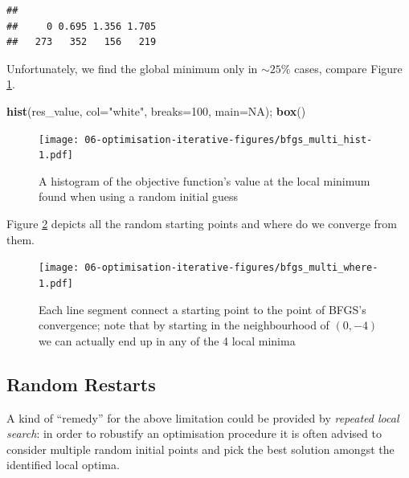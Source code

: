 \documentclass[10pt,b5paper,krantz1]{krantz}
\newenvironment{Shaded}{\begin{snugshade}}{\end{snugshade}}
\newcommand{\DataTypeTok}[1]{\textcolor[rgb]{0.27,0.27,0.27}{#1}}
\newcommand{\DecValTok}[1]{\textcolor[rgb]{0.06,0.06,0.06}{#1}}
\newcommand{\KeywordTok}[1]{\textcolor[rgb]{0.27,0.27,0.27}{\textbf{#1}}}
\newcommand{\NormalTok}[1]{#1}
\newcommand{\OtherTok}[1]{\textcolor[rgb]{0.37,0.37,0.37}{#1}}
\newcommand{\StringTok}[1]{\textcolor[rgb]{0.5,0.5,0.5}{#1}}
\begin{document}
\begin{verbatim}
## 
##     0 0.695 1.356 1.705 
##   273   352   156   219
\end{verbatim}

Unfortunately, we find the global minimum only in \(\sim 25\%\) cases,
compare Figure \ref{fig:bfgs_multi_hist}.

\begin{Shaded}
\begin{Highlighting}[]
\KeywordTok{hist}\NormalTok{(res_value, }\DataTypeTok{col=}\StringTok{"white"}\NormalTok{, }\DataTypeTok{breaks=}\DecValTok{100}\NormalTok{, }\DataTypeTok{main=}\OtherTok{NA}\NormalTok{); }\KeywordTok{box}\NormalTok{()}
\end{Highlighting}
\end{Shaded}

\begin{figure}
\hypertarget{fig:bfgs_multi_hist}{%
\centering
\texttt{[image: 06-optimisation-iterative-figures/bfgs\_multi\_hist-1.pdf]}
\caption{A histogram of the objective function's value at the local minimum found when using a random initial guess}\label{fig:bfgs_multi_hist}
}
\end{figure}

Figure \ref{fig:bfgs_multi_where} depicts all the random starting points and where
do we converge from them.

\begin{figure}
\hypertarget{fig:bfgs_multi_where}{%
\centering
\texttt{[image: 06-optimisation-iterative-figures/bfgs\_multi\_where-1.pdf]}
\caption{Each line segment connect a starting point to the point of BFGS's convergence; note that by starting in the neighbourhood of \((0,-4)\) we can actually end up in any of the 4 local minima}\label{fig:bfgs_multi_where}
}
\end{figure}

\hypertarget{random-restarts}{%
\subsection{Random Restarts}\label{random-restarts}}

A kind of ``remedy'' for the above limitation
could be provided by \emph{repeated local search}:
in order to robustify an optimisation
procedure it is often advised to consider
multiple random initial points
and pick the best solution amongst the identified local optima.
\end{document}
